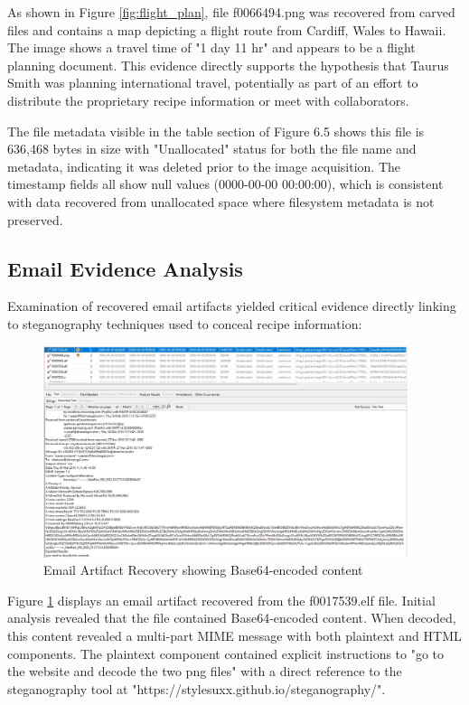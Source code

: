 As shown in Figure \ref{fig:flight_plan}, file f0066494.png was recovered from carved files and contains a map depicting a flight route from Cardiff, Wales to Hawaii. The image shows a travel time of "1 day 11 hr" and appears to be a flight planning document. This evidence directly supports the hypothesis that Taurus Smith was planning international travel, potentially as part of an effort to distribute the proprietary recipe information or meet with collaborators.

The file metadata visible in the table section of Figure 6.5 shows this file is 636,468 bytes in size with "Unallocated" status for both the file name and metadata, indicating it was deleted prior to the image acquisition. The timestamp fields all show null values (0000-00-00 00:00:00), which is consistent with data recovered from unallocated space where filesystem metadata is not preserved.

\subsection{Email Evidence Analysis}
Examination of recovered email artifacts yielded critical evidence directly linking to steganography techniques used to conceal recipe information:

\begin{figure}[h]
    \centering
    \includegraphics[width=0.95\textwidth]{images/Evidence Examination/Image6.png}
    \caption{Email Artifact Recovery showing Base64-encoded content}
    \label{fig:email_artifact}
\end{figure}

Figure \ref{fig:email_artifact} displays an email artifact recovered from the f0017539.elf file. Initial analysis revealed that the file contained Base64-encoded content. When decoded, this content revealed a multi-part MIME message with both plaintext and HTML components. The plaintext component contained explicit instructions to "go to the website and decode the two png files" with a direct reference to the steganography tool at "https://stylesuxx.github.io/steganography/".

